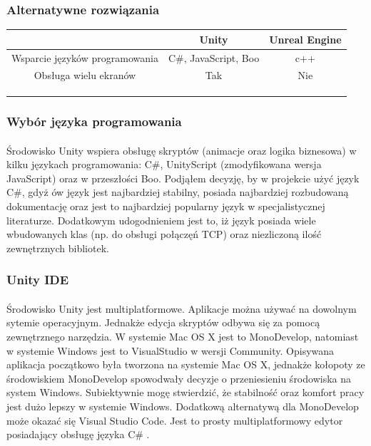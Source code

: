 \documentclass[12pt]{article}
\begin{document}
{\subsubsection{Alternatywne rozwiązania}
 \begin{tabular}{|c|c|c|}
 \hline
 \ & Unity & Unreal Engine \\ 
  \hline
 Wsparcie języków programowania & C\#, JavaScript, Boo & c++ \\  
  \hline
 Obsługa wielu ekranów & Tak & Nie \\
 \hline  
  &  &  \\
  \hline   
  &  &  \\
  \hline   
  &  &  \\
  \hline   
\end{tabular}

\subsubsection{Wybór języka programowania}
\paragraph{}
Środowisko Unity wspiera obsługę skryptów (animacje oraz logika biznesowa) w kilku językach programowania: C\#, UnityScript (zmodyfikowana wersja JavaScript)  oraz w przeszłości Boo. Podjąłem decyzję, by w projekcie użyć język C\#, gdyż ów język jest najbardziej stabilny, posiada najbardziej rozbudowaną dokumentację oraz jest to najbardziej popularny język w specjalistycznej literaturze. Dodatkowym udogodnieniem  jest to, iż  język posiada wiele wbudowanych klas (np. do obsługi połączęń TCP) oraz niezliczoną ilość zewnętrznych bibliotek.
\subsubsection{Unity IDE}
\paragraph{}
Środowisko Unity jest multiplatformowe. Aplikacje można używać na dowolnym sytemie operacyjnym. Jednakże edycja skryptów odbywa się za pomocą zewnętrznego narzędzia. W systemie Mac OS X jest to MonoDevelop, natomiast w systemie Windows jest to VisualStudio w wersji Community. Opisywana aplikacja początkowo była tworzona na systemie Mac OS X, jednakże kołopoty ze środowiskiem MonoDevelop spowodwały decyzje o przeniesieniu środowiska na system Windows. Subiektywnie mogę stwierdzić, że stabilność oraz komfort pracy jest dużo lepszy w systemie Windows.
Dodatkową alternatywą dla MonoDevelop może okazać się Visual Studio Code. Jest to prosty multiplatformowy edytor posiadający obsługę języka C\# .

}
\end{document}
